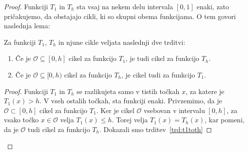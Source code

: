\documentclass[mat2]{fmfdelo}
\begin{document}
\begin{proof}
Funkciji $T_1$ in $T_h$ sta vsaj na nekem delu intervala $[0, 1]$ enaki, zato pričakujemo, da obstajajo cikli, ki so skupni obema funkcijama. O tem govori naslednja lema:
\begin{lema}\label{lem:t1th}
Za funkciji $T_1$, $T_h$ in njune cikle  veljata naslednji dve trditvi:
\begin{enumerate}[label={(\arabic*)}]
\item Če je $\mathcal{O} \subseteq [0, h]$ cikel za funkcijo $T_1$, je tudi cikel za funkcijo $T_h$. \label{trd:t1toth}
\item Če je $\mathcal{O} \subseteq [0, h)$ cikel za funkcijo $T_h$, je cikel tudi za funkcijo $T_1$. \label{trd:thtot1}
\end{enumerate}
\end{lema}
\begin{proof}
Funkciji $T_1$ in $T_h$ se razlikujeta samo v tistih točkah $x$, za katere je $T_1(x) > h$. V vseh ostalih točkah, sta funkciji enaki. Privzemimo, da je $\mathcal{O} \subset [0, h]$ cikel za funkcijo $T_1$. Ker je cikel $\mathcal{O}$ vsebovan v intervalu $[0, h]$, za vsako točko $x \in \mathcal{O}$ velja $T_1(x) \leq h$. Torej velja $T_1(x)=T_h(x)$, kar pomeni, da je $\mathcal{O}$ tudi cikel za funkcijo $T_h$. Dokazali smo trditev~\ref{trd:t1toth}


\end{proof}
\end{proof}
\end{document}
